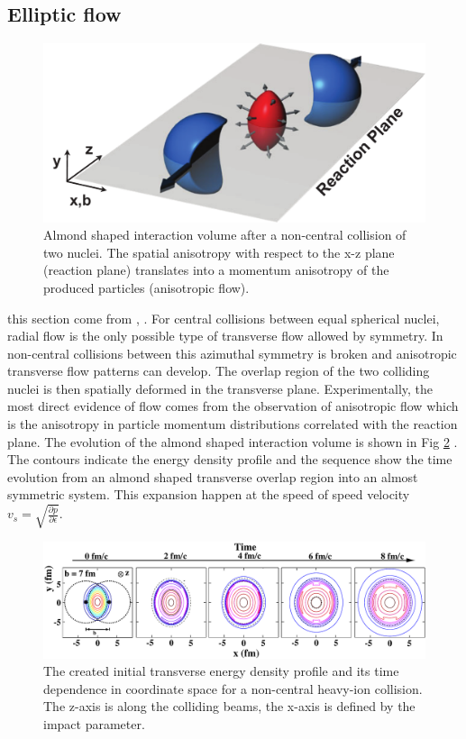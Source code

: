 \documentclass[12pt,a4paper]{book}
\begin{document}
	\subsection{Elliptic flow}
	\begin{figure}[ht]
		\centering
		\includegraphics[width=0.8\linewidth]{pictures/elliptic_flow_collision.pdf}
		\caption{Almond shaped interaction volume after a non-central collision of two nuclei. The spatial anisotropy with respect to the x-z plane (reaction plane) translates into a momentum anisotropy of the produced particles (anisotropic flow).}
		\label{fig:elliptic_flow_collision} 
	\end{figure}
	this section come from \cite{Snellings_2011}, \cite{heinz2004conceptsheavyionphysics} \cite{Kolb_2000}. 
	For central collisions between equal spherical nuclei, radial flow is the only possible type of transverse flow allowed by symmetry. In non-central collisions between this azimuthal symmetry is broken and anisotropic transverse flow patterns can develop. The overlap region of the two colliding nuclei is then spatially deformed in the transverse plane. Experimentally, the most direct evidence of flow comes from the observation of anisotropic flow which is the anisotropy in particle momentum distributions correlated with the reaction plane. The evolution of the almond shaped interaction volume is shown in Fig \ref{fig:time_evolution_perepheral} \cite{kolb2003hydrodynamicdescriptionultrarelativisticheavyion}. The contours indicate the energy density profile and the sequence show the time evolution from an almond shaped transverse overlap region into an almost symmetric system. This expansion happen at the speed of speed velocity $v_s=\sqrt{\frac{\partial p}{\partial \epsilon}}$. 
	\begin{figure}[ht]
		\centering
		\includegraphics[width=0.8\linewidth]{pictures/timeEvolutionPerepheral.pdf}
		\caption{The created initial transverse energy density profile and its time	dependence in coordinate space for a non-central heavy-ion collision. The z-axis is along the colliding beams, the x-axis is defined by the impact parameter.}
		\label{fig:time_evolution_perepheral} 
	\end{figure}
\end{document}
